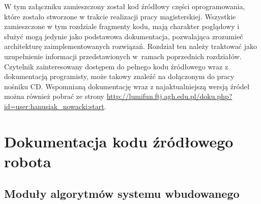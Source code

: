 \label{ch:source-code}
W tym załączniku zamieszczony został kod źródłowy części oprogramowania,
które zostało stworzone w trakcie realizacji pracy magisterskiej. Wszystkie
zamieszczone w tym rozdziale fragmenty kodu, mają charakter poglądowy i służyć
mogą jedynie jako podstawowa dokumentacja, pozwalająca zrozumieć architekturę
zaimplementowanych rozwiązań. Rozdział ten należy traktować jako
uzupełnienie informacji przedstawionych w~ramach poprzednich rozdziałów.
Czytelnik zainteresowany dostępem do pełnego kodu źródłowego wraz z dokumentacją
programisty, może takowy znaleźć na dołączonym do pracy nośniku CD. Wspomnianą
dokumentację wraz z najaktualniejszą wersją źródeł można również pobrać ze
strony \url{http://lumifun.ftj.agh.edu.pl/doku.php?id=user:hanusiak_nowacki:start}.

\section{Dokumentacja kodu źródłowego robota} 









\newpage
\subsection{Moduły algorytmów systemu wbudowanego}



